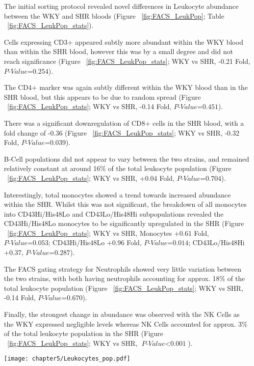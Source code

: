 The initial sorting protocol revealed novel differences in Leukocyte abundance between the WKY and SHR bloods (Figure ~\ref{fig:FACS_LeukPop}; Table ~\ref{fig:FACS_LeukPop_stats}). 

Cells expressing CD3+ appeared subtly more abundant within the WKY blood than within the SHR blood, however this was by a small degree and did not reach significance  (Figure ~\ref{fig:FACS_LeukPop_stats}; WKY vs SHR, -0.21 Fold, $\textit{P-Value=0.254}$). 

The CD4+ marker was again subtly different within the WKY blood than in the SHR blood, but this appears to be due to random spread (Figure ~\ref{fig:FACS_LeukPop_stats}; WKY vs SHR, -0.14 Fold, $\textit{P-Value=0.451}$).

There was a significant downregulation of CD8+ cells in the SHR blood, with a fold change of -0.36 (Figure ~\ref{fig:FACS_LeukPop_stats}; WKY vs SHR, -0.32 Fold, $\textit{P-Value=0.039}$).

B-Cell populations did not appear to vary between the two strains, and remained relatively constant at around 16\% of the total leukocyte population (Figure ~\ref{fig:FACS_LeukPop_stats}; WKY vs SHR, +0.04 Fold, $\textit{P-Value=0.704}$). 

Interestingly, total monocytes showed a trend towards increased abundance within the SHR. Whilst this was not significant, the breakdown of all monocytes into CD43Hi/His48Lo and CD43Lo/His48Hi subpopulations revealed the CD43Hi/His48Lo monocytes to be significantly upregulated in the SHR (Figure ~\ref{fig:FACS_LeukPop_stats}; WKY vs SHR, Monocytes +0.61 Fold, $\textit{P-Value=0.053}$; CD43Hi/His48Lo +0.96 Fold, $\textit{P-Value=0.014}$; CD43Lo/His48Hi +0.37, $\textit{P-Value=0.287}$). 

The FACS gating strategy for Neutrophils showed very little variation between the two strains, with both having neutrophils accounting for approx. 18\% of the total leukocyte population (Figure ~\ref{fig:FACS_LeukPop_stats}; WKY vs SHR, -0.14 Fold, $\textit{P-Value=0.670}$). 

Finally, the strongest change in abundance was observed with the NK Cells as the WKY expressed negligible levels whereas NK Cells accounted for approx. 3\% of the total leukocyte population in the SHR (Figure ~\ref{fig:FACS_LeukPop_stats}; WKY vs SHR, $\textit{P-Value$<$0.001}$). \\

\begin{figure*}[!htbp]
\centering
\texttt{[image: chapter5/Leukocytes\_pop.pdf]}
\caption[Differences in leukocyte populations across \acrshort{wky} and \acrshort{shr} strains]{Differences in leukocyte populations across \acrshort{wky} and \acrshort{shr} strains. Statistical analysis made use of a Student's T-Test (P-Value $<$0.05, *; $<$0.01, **; $<$0.001, ***;  $<$0.0001, ****).}
\label{fig:FACS_LeukPop}
\end{figure*}


